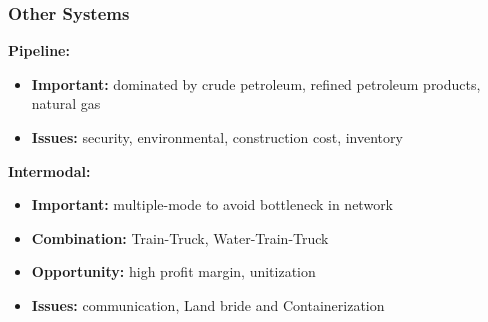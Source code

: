 \documentclass[10pt,presentation]{beamer}
\begin{document}
\begin{frame}
  \frametitle{Other Systems}

  \textbf{Pipeline:}
  \begin{itemize}
    \item \textbf{Important:} dominated by crude petroleum, refined petroleum products, natural gas
    \item \textbf{Issues:} \alert{security}, environmental, construction cost, inventory
  \end{itemize}

  \NextHalfLine
  \textbf{Intermodal:}
  \begin{itemize}
    \item \textbf{Important:} multiple-mode to avoid bottleneck in network
    \item \textbf{Combination:} Train-Truck, Water-Train-Truck
    \item \textbf{Opportunity:} high profit margin, unitization
    \item \textbf{Issues:} \alert{communication}, Land bride and Containerization
   \end{itemize}


  \end{frame}
\end{document}
